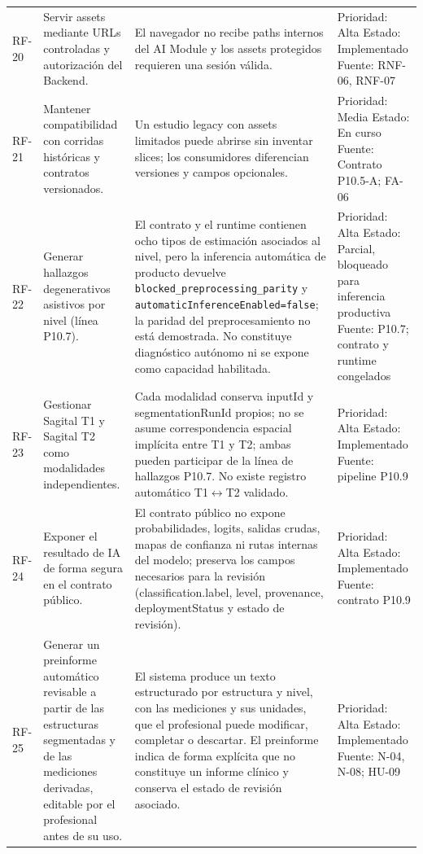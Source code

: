 {\begin{longtable}{>{\raggedright\arraybackslash}p{} >{\raggedright\arraybackslash}p{} >{\raggedright\arraybackslash}p{} >{\raggedright\arraybackslash}p{}}
RF-20 & Servir assets mediante URLs controladas y autorización del Backend. & El navegador no recibe paths internos del AI Module y los assets protegidos requieren una sesión válida. & Prioridad: Alta Estado: Implementado Fuente: RNF-06, RNF-07 \\
RF-21 & Mantener compatibilidad con corridas históricas y contratos versionados. & Un estudio legacy con assets limitados puede abrirse sin inventar slices; los consumidores diferencian versiones y campos opcionales. & Prioridad: Media Estado: En curso Fuente: Contrato P10.5-A; FA-06 \\
RF-22 & Generar hallazgos degenerativos asistivos por nivel (línea P10.7). & El contrato y el runtime contienen ocho tipos de estimación asociados al nivel, pero la inferencia automática de producto devuelve \texttt{blocked\_preprocessing\_parity} y \texttt{automaticInferenceEnabled=false}; la paridad del preprocesamiento no está demostrada. No constituye diagnóstico autónomo ni se expone como capacidad habilitada. & Prioridad: Alta Estado: Parcial, bloqueado para inferencia productiva Fuente: P10.7; contrato y runtime congelados \\
RF-23 & Gestionar Sagital T1 y Sagital T2 como modalidades independientes. & Cada modalidad conserva inputId y segmentationRunId propios; no se asume correspondencia espacial implícita entre T1 y T2; ambas pueden participar de la línea de hallazgos P10.7. No existe registro automático T1\ensuremath{\leftrightarrow}T2 validado. & Prioridad: Alta Estado: Implementado Fuente: pipeline P10.9 \\
RF-24 & Exponer el resultado de IA de forma segura en el contrato público. & El contrato público no expone probabilidades, logits, salidas crudas, mapas de confianza ni rutas internas del modelo; preserva los campos necesarios para la revisión (classification.label, level, provenance, deploymentStatus y estado de revisión). & Prioridad: Alta Estado: Implementado Fuente: contrato P10.9 \\
RF-25 & Generar un preinforme automático revisable a partir de las estructuras segmentadas y de las mediciones derivadas, editable por el profesional antes de su uso. & El sistema produce un texto estructurado por estructura y nivel, con las mediciones y sus unidades, que el profesional puede modificar, completar o descartar. El preinforme indica de forma explícita que no constituye un informe clínico y conserva el estado de revisión asociado. & Prioridad: Alta Estado: Implementado Fuente: N-04, N-08; HU-09 \\
\hline
\end{longtable}
}

